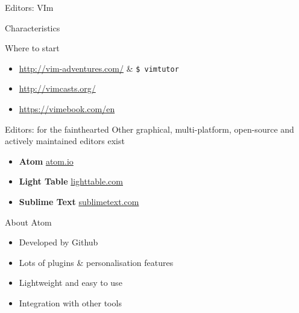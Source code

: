 \documentclass[10pt]{beamer}
\begin{document}
\begin{frame}{Editors: VIm}
{\begin{block}{Characteristics}
\begin{itemize}
			\end{itemize}
		\end{block}
		\begin{block}{Where to start}
			\begin{itemize}
				\item \url{http://vim-adventures.com/} \& \texttt{\$ vimtutor}
				\item \url{http://vimcasts.org/}
				\item \url{https://vimebook.com/en}
			\end{itemize}
		\end{block}
	}
\end{frame}


\begin{frame}{Editors: for the fainthearted} %
	Other graphical, multi-platform, open-source and actively maintained editors exist

	\begin{itemize}
		\item \textbf{Atom} \hfill \url{atom.io}
		\item \textbf{Light Table} \hfill \url{lighttable.com}
		\item \textbf{Sublime Text} \hfill \url{sublimetext.com}
	\end{itemize}

	\pauseo
	\medskip

	\begin{block}{About Atom}
		\begin{itemize}
			\item Developed by Github
			\item Lots of plugins \& personalisation features
			\item Lightweight and easy to use
			\item Integration with other tools
		\end{itemize}
	\end{block}

\end{frame}
\end{document}
